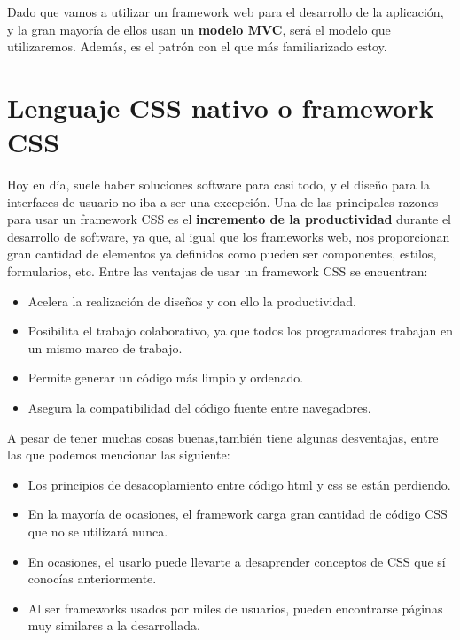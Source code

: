 Dado que vamos a utilizar un framework web para el desarrollo de la aplicación, y la gran
mayoría de ellos usan un \textbf{modelo MVC}, será el modelo que utilizaremos. Además, es el
patrón con el que más familiarizado estoy.

\section{Lenguaje CSS nativo o framework CSS} \label{sec:css-frameworkcss}
Hoy en día, suele haber soluciones software para casi todo, y el diseño para la interfaces
de usuario no iba a ser una excepción. Una de las principales razones para usar un framework
CSS es el \textbf{incremento de la productividad} durante el desarrollo de software, ya que,
al igual que los frameworks web, nos proporcionan gran cantidad de elementos ya definidos
como pueden ser componentes, estilos, formularios, etc. Entre las ventajas de usar un
framework CSS se encuentran:

    \begin{itemize}
        \item Acelera la realización de diseños y con ello la productividad.
        \item Posibilita el trabajo colaborativo, ya que todos los programadores
        trabajan en un mismo marco de trabajo.
        \item Permite generar un código más limpio y ordenado.
        \item Asegura la compatibilidad del código fuente entre navegadores.
    \end{itemize}

A pesar de tener muchas cosas buenas,también tiene algunas desventajas, entre las que
podemos mencionar las siguiente:

    \begin{itemize}
        \item Los principios de desacoplamiento entre código html y css se están perdiendo.
        \item En la mayoría de ocasiones, el framework carga gran cantidad de código CSS
        que no se utilizará nunca.
        \item En ocasiones, el usarlo puede llevarte a desaprender conceptos de CSS que sí
        conocías anteriormente.
        \item Al ser frameworks usados por miles de usuarios, pueden encontrarse páginas
        muy similares a la desarrollada.
    \end{itemize}

